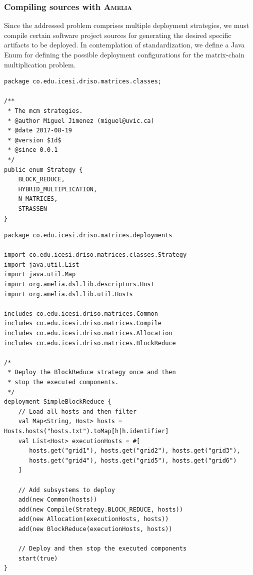 \documentclass{article}
\newcommand\amelia[0]{\textsc{Amelia}}
\begin{document}
\subsubsection{Compiling sources with \amelia{}}

Since the addressed problem comprises multiple deployment strategies, we must compile certain software project sources for generating the desired specific artifacts to be deployed. In contemplation of standardization, we define a Java Enum for defining the possible deployment configurations for the matrix-chain multiplication problem. \\

\begin{lstlisting}[style=amelia,caption=Java Enum for possible deployment configurations.]
package co.edu.icesi.driso.matrices.classes;

/**
 * The mcm strategies.
 * @author Miguel Jimenez (miguel@uvic.ca)
 * @date 2017-08-19
 * @version $Id$
 * @since 0.0.1
 */
public enum Strategy {
    BLOCK_REDUCE,
    HYBRID_MULTIPLICATION,
    N_MATRICES,
    STRASSEN
}

\end{lstlisting}

\begin{lstlisting}[style=amelia,caption=Deployment for BlockReduce]
package co.edu.icesi.driso.matrices.deployments

import co.edu.icesi.driso.matrices.classes.Strategy
import java.util.List
import java.util.Map
import org.amelia.dsl.lib.descriptors.Host
import org.amelia.dsl.lib.util.Hosts

includes co.edu.icesi.driso.matrices.Common
includes co.edu.icesi.driso.matrices.Compile
includes co.edu.icesi.driso.matrices.Allocation
includes co.edu.icesi.driso.matrices.BlockReduce

/*
 * Deploy the BlockReduce strategy once and then
 * stop the executed components.
 */
deployment SimpleBlockReduce {
	// Load all hosts and then filter
	val Map<String, Host> hosts = Hosts.hosts("hosts.txt").toMap[h|h.identifier]
	val List<Host> executionHosts = #[
	   hosts.get("grid1"), hosts.get("grid2"), hosts.get("grid3"),
	   hosts.get("grid4"), hosts.get("grid5"), hosts.get("grid6")
	]

	// Add subsystems to deploy
	add(new Common(hosts))
	add(new Compile(Strategy.BLOCK_REDUCE, hosts))
	add(new Allocation(executionHosts, hosts))
	add(new BlockReduce(executionHosts, hosts))

	// Deploy and then stop the executed components
	start(true)
}
\end{lstlisting}
\end{document}

